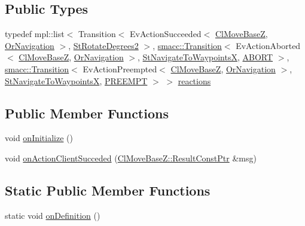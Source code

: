 \subsection*{Public Types}
\begin{DoxyCompactItemize}
\item 
typedef mpl\+::list$<$ Transition$<$ Ev\+Action\+Succeeded$<$ \hyperlink{classmove__base__z__client_1_1ClMoveBaseZ}{Cl\+Move\+BaseZ}, \hyperlink{classsm__dance__bot_1_1OrNavigation}{Or\+Navigation} $>$, \hyperlink{structsm__dance__bot_1_1StRotateDegrees2}{St\+Rotate\+Degrees2} $>$, \hyperlink{classsmacc_1_1Transition}{smacc\+::\+Transition}$<$ Ev\+Action\+Aborted$<$ \hyperlink{classmove__base__z__client_1_1ClMoveBaseZ}{Cl\+Move\+BaseZ}, \hyperlink{classsm__dance__bot_1_1OrNavigation}{Or\+Navigation} $>$, \hyperlink{structsm__dance__bot_1_1StNavigateToWaypointsX}{St\+Navigate\+To\+WaypointsX}, \hyperlink{classABORT}{A\+B\+O\+RT} $>$, \hyperlink{classsmacc_1_1Transition}{smacc\+::\+Transition}$<$ Ev\+Action\+Preempted$<$ \hyperlink{classmove__base__z__client_1_1ClMoveBaseZ}{Cl\+Move\+BaseZ}, \hyperlink{classsm__dance__bot_1_1OrNavigation}{Or\+Navigation} $>$, \hyperlink{structsm__dance__bot_1_1StNavigateToWaypointsX}{St\+Navigate\+To\+WaypointsX}, \hyperlink{classPREEMPT}{P\+R\+E\+E\+M\+PT} $>$ $>$ \hyperlink{structsm__dance__bot_1_1StNavigateForward1_ae577e9eea9fdb0a77c3ca7ed21a8f295}{reactions}
\end{DoxyCompactItemize}
\subsection*{Public Member Functions}
\begin{DoxyCompactItemize}
\item 
void \hyperlink{structsm__dance__bot_1_1StNavigateForward1_aca9caa8bd74d17b2d735db4cfb3cfe4c}{on\+Initialize} ()
\item 
void \hyperlink{structsm__dance__bot_1_1StNavigateForward1_a82cc8f8303c3b090edfe3b8e6c807b77}{on\+Action\+Client\+Succeded} (\hyperlink{classmove__base__z__client_1_1ClMoveBaseZ_a3b774d99d3dd4526f99b968d65ef5834}{Cl\+Move\+Base\+Z\+::\+Result\+Const\+Ptr} \&msg)
\end{DoxyCompactItemize}
\subsection*{Static Public Member Functions}
\begin{DoxyCompactItemize}
\item 
static void \hyperlink{structsm__dance__bot_1_1StNavigateForward1_a81efc621988f772ae4de92ab9e3130b7}{on\+Definition} ()
\end{DoxyCompactItemize}
